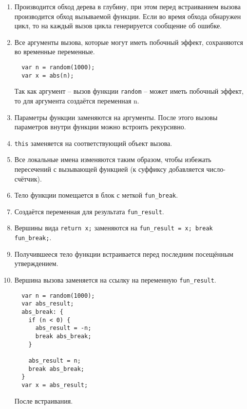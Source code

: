 \begin{enumerate}
  \item Производится обход дерева в глубину, при этом перед
  встраиванием вызова производится обход вызываемой функции.
  Если во время обхода обнаружен цикл, то на каждый вызов цикла
  генерируется сообщение об ошибке.
  \item Все аргументы вызова, которые могут иметь побочный эффект,
  сохраняются во временные переменные.
  \begin{listing}[H]
  \begin{verbatim}
  var n = random(1000);
  var x = abs(n);
  \end{verbatim}
  \caption{Так как аргумент -- вызов функции \texttt{random} --
  может иметь побочный эффект, то для аргумента создаётся переменная n.}
  \end{listing}
  \item Параметры функции заменяются на аргументы. После этого
  вызовы параметров внутри функции можно встроить рекурсивно.
  \item \texttt{this} заменяется на соответствующий объект
  вызова.
  \item Все локальные имена изменяются таким образом, чтобы избежать
  пересечений с вызывающей функцией (к суффиксу добавляется число-счётчик).
  \item Тело функции помещается в блок с меткой \texttt{fun\_break}.
  \item Создаётся переменная для результата \texttt{fun\_result}.
  \item Вершины вида \texttt{return x;} заменяются на \texttt{fun\_result = x; break fun\_break;}.
  \item Получившееся тело функции встраивается перед последним посещённым
  утверждением.
  \item Вершина вызова заменяется на ссылку на переменную \texttt{fun\_result}.
  \begin{listing}[H]
  \begin{verbatim}
  var n = random(1000);
  var abs_result;
  abs_break: {
    if (n < 0) {
      abs_result = -n;
      break abs_break;
    }

    abs_result = n;
    break abs_break;
  }
  var x = abs_result;
  \end{verbatim}
  \caption{После встраивания.}
  \end{listing}
\end{enumerate}

